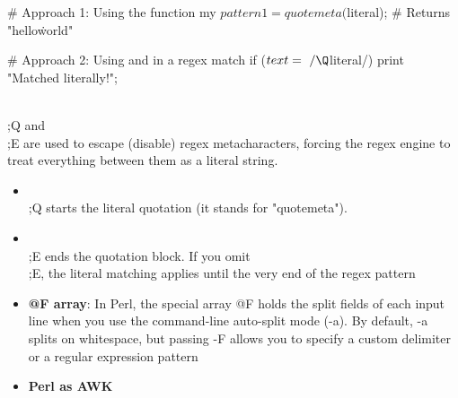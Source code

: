 \documentclass{report}
\begin{document}
\begin{itemize}
\begin{perlcode}
                # Approach 1: Using the function
                my $pattern1 = quotemeta($literal); # Returns "hello\.world\*"

                # Approach 2: Using \Q and \E in a regex match
                if ($text =~ /\Q$literal\E/) {
                    print "Matched literally!";
                }
            \end{perlcode}
            \bigbreak \noindent 
            \string\\;Q and \string\\;E are used to escape (disable) regex metacharacters, forcing the regex engine to treat everything between them as a literal string.
            \begin{itemize}
                \item \string\\;Q starts the literal quotation (it stands for "quotemeta").
                \item \string\\;E ends the quotation block. If you omit \string\\;E, the literal matching applies until the very end of the regex pattern
            \end{itemize}


    \end{itemize}

    \pagebreak 
    \begin{itemize}
        \item \textbf{@F array}: In Perl, the special array @F holds the split fields of each input line when you use the command-line auto-split mode (-a).
            \bigbreak \noindent 
            By default, -a splits on whitespace, but passing -F allows you to specify a custom delimiter or a regular expression pattern
        \item \textbf{Perl as AWK}
            \bigbreak \noindent 



    \end{itemize}






    
\end{document}
